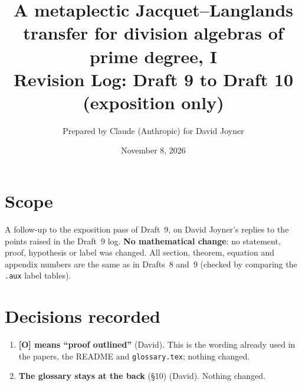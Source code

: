 \documentclass[11pt]{article}
\title{A metaplectic Jacquet--Langlands transfer for division algebras of prime degree, I\\
Revision Log: Draft 9 to Draft 10 (exposition only)}
\author{Prepared by Claude (Anthropic) for David Joyner}
\date{November 8, 2026}
\begin{document}
\maketitle

\section*{Scope}
A follow-up to the exposition pass of Draft~9, on David Joyner's
replies to the points raised in the Draft~9 log.  \textbf{No
mathematical change}: no statement, proof, hypothesis or label was
changed.  All section, theorem, equation and appendix numbers are the
same as in Drafts~8 and~9 (checked by comparing the \texttt{.aux}
label tables).

\section*{Decisions recorded}
\begin{enumerate}[leftmargin=*]
\item \textbf{[O] means ``proof outlined''} (David).  This is the
wording already used in the papers, the README and \texttt{glossary.tex};
nothing changed.
\item \textbf{The glossary stays at the back} (\S10) (David).  Nothing
changed.
\end{enumerate}
\end{document}
